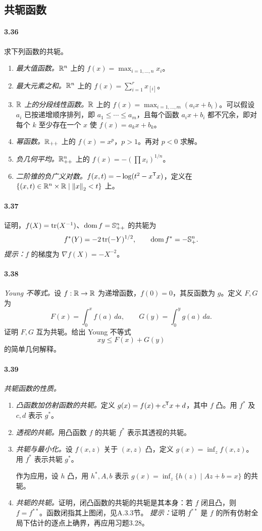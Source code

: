 \subsection*{共轭函数}
\paragraph{3.36}求下列函数的共轭。
\begin{enumerate}[label=(\alph*)]
\item \textit{最大值函数。}$\mathbb R^n$ 上的 $f(x)=\max_{i=1,\ldots,n}x_i$。
\item \textit{最大元素之和。}$\mathbb R^n$ 上的 $f(x)=\sum_{i=1}^r x_{[i]}$。
\item \textit{$\mathbb R$ 上的分段线性函数。}$\mathbb R$ 上的 $f(x)=\max_{i=1,\ldots,m}(a_ix+b_i)$。可以假设 $a_i$ 已按递增顺序排列，即 $a_1\leq\cdots\leq a_m$，且每个函数 $a_ix+b_i$ 都不冗余，即对每个 $k$ 至少存在一个 $x$ 使 $f(x)=a_kx+b_k$。
\item \textit{幂函数。}$\mathbb R_{++}$ 上的 $f(x)=x^p$，$p>1$。再对 $p<0$ 求解。
\item \textit{负几何平均。}$\mathbb R_{++}^n$ 上的 $f(x)=-(\prod x_i)^{1/n}$。
\item \textit{二阶锥的负广义对数。}$f(x,t)=-\log(t^2-x^\mathsf T x)$，定义在 $\{(x,t)\in\mathbb R^n\times\mathbb R\mid\left\lVert x\right\rVert_2<t\}$ 上。
\end{enumerate}
\paragraph{3.37}证明，$f(X)=\operatorname{tr}(X^{-1})$、$\operatorname{dom} f=\mathbb S_{++}^n$ 的共轭为
\[f^*(Y)=-2\operatorname{tr}(-Y)^{1/2},\qquad\operatorname{dom} f^*=-\mathbb S_+^n.\]
\textit{提示：}$f$ 的梯度为 $\nabla f(X)=-X^{-2}$。
\paragraph{3.38}\textit{Young 不等式。}设 $f:\mathbb R\to\mathbb R$ 为递增函数，$f(0)=0$，其反函数为 $g$。定义 $F,G$ 为
\[F(x)=\int_0^x f(a)\,da,\qquad G(y)=\int_0^y g(a)\,da.\]
证明 $F,G$ 互为共轭。给出 Young 不等式
\[xy\leq F(x)+G(y)\]
的简单几何解释。
\paragraph{3.39}\textit{共轭函数的性质。}
\begin{enumerate}[label=(\alph*)]
\item \textit{凸函数加仿射函数的共轭。}定义 $g(x)=f(x)+c^\mathsf T x+d$，其中 $f$ 凸。用 $f^*$ 及 $c,d$ 表示 $g^*$。
\item \textit{透视的共轭。}用凸函数 $f$ 的共轭 $f^*$ 表示其透视的共轭。
\item \textit{共轭与最小化。}设 $f(x,z)$ 关于 $(x,z)$ 凸，定义 $g(x)=\inf_z f(x,z)$。用 $f^*$ 表示共轭 $g^*$。

作为应用，设 $h$ 凸，用 $h^*,A,b$ 表示 $g(x)=\inf_z\{h(z)\mid Az+b=x\}$ 的共轭。
\item \textit{共轭的共轭。}证明，闭凸函数的共轭的共轭是其本身：若 $f$ 闭且凸，则 $f=f^{**}$。函数闭指其上图闭，见A.3.3节。
\textit{提示：}证明 $f^{**}$ 是 $f$ 的所有仿射全局下估计的逐点上确界，再应用习题3.28。
\end{enumerate}
